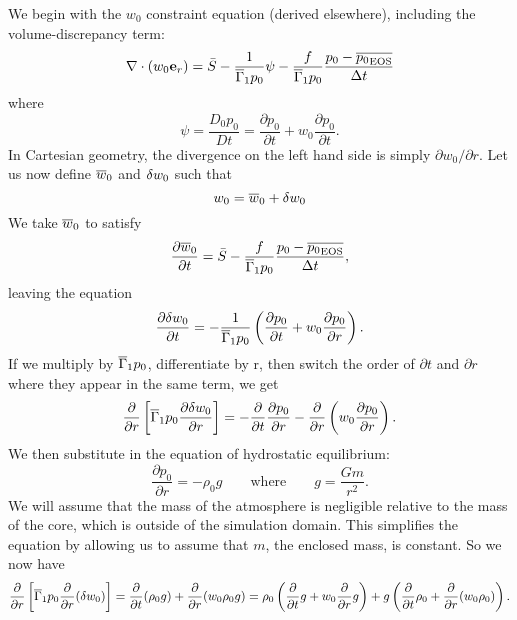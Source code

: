 We begin with the $w_0$ constraint equation (derived elsewhere), including the volume-discrepancy term:
\begin{equation}
\nabla \cdot  ({w_0 \mathbf{e}_r}) = \bar{S} - \frac{1}{\overline{\Gamma}_1 p_0} \psi - \frac{f}{\overline{\Gamma}_1 p_0} \frac{p_0 - \overline{{p_0}_\mathrm{EOS}}}{\Delta t}
\end{equation}
where
\[ \psi = \frac{D_0 p_0}{D t} = \frac{\partial p_0}{\partial t} + w_0 \frac{\partial p_0}{\partial t}. \]
In Cartesian geometry, the divergence on the left hand side is simply $\partial
w_0 / \partial r$.
Let us now define $\overline{w}_0$ and $\delta w_0$ such that
\[ w_0 = \overline{w}_0 + \delta w_0 \]
We take $\overline{w}_0$ to satisfy
\begin{equation}
\frac{\partial \overline{w}_0}{\partial t} = \bar{S} - \frac{f}{\overline{\Gamma}_1 p_0} \frac{p_0 - \overline{{p_0}_\mathrm{EOS}}}{\Delta t} ,
\end{equation}
leaving the equation
\begin{equation}
\frac{\partial \delta w_0}{\partial t} = - \frac{1}{\overline{\Gamma}_1 p_0} \left ({ \frac{\partial p_0}{\partial t} + w_0 \frac{\partial p_0}{\partial r}} \right ).
\end{equation}
%
If we multiply by $\overline{\Gamma}_1 p_0$, differentiate by r, then switch the order of $\partial
t$ and $\partial r$ where they appear in the same term, we get
\begin{equation}
\frac{\partial}{\partial r} \left[ \overline{\Gamma}_1 p_0 \frac{\partial \delta w_0}{\partial r} \right] =
   - \frac{\partial}{\partial t} \frac{\partial p_0}{\partial r} -  \frac{\partial}{\partial r} \left (w_0 \frac{\partial p_0}{\partial r} \right) .
\end{equation}
%
We then substitute in the equation of hydrostatic equilibrium:
\[ \frac{\partial p_0}{\partial r} = -\rho_0 g \quad\quad \mbox{where} \quad\quad
   g = \frac{G m}{r^2}. \]
We will assume that the mass of the atmosphere is negligible relative to the
mass of the core, which is outside of the simulation domain.  This simplifies
the equation by allowing us to assume that $m$, the enclosed mass, is constant.
So we now have
\begin{equation}
\frac{\partial}{\partial r} \left[ \overline{\Gamma}_1 p_0 \frac{\partial}{\partial r}{({\delta w_0})} \right]
   = \frac{\partial}{\partial t}{({\rho_0 g}}) + \frac{\partial}{\partial r}{({w_0 \rho_0 g})}
   = \rho_0 \left ({\frac{\partial}{\partial t}{g} + w_0 \frac{\partial}{\partial r}{g}} \right )
         + g \left ({\frac{\partial}{\partial t}{\rho_0} + \frac{\partial}{\partial r}{({w_0 \rho_0})}} \right ).
\end{equation}


